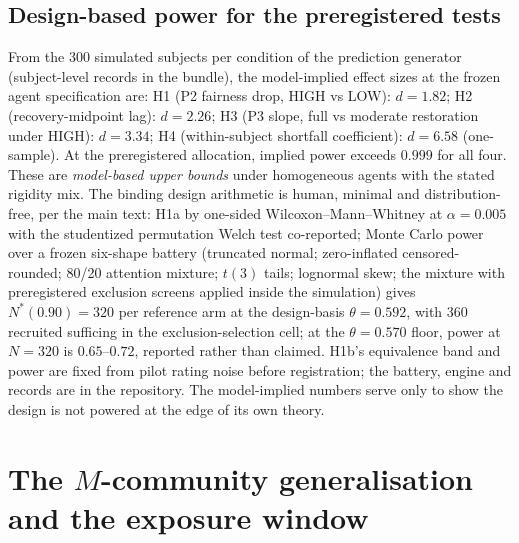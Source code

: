 \documentclass[11pt]{article}
\newcommand{\1}{\mathbf{1}}
\begin{document}
\subsection{Design-based power for the preregistered tests}
From the 300 simulated subjects per condition of the prediction generator
(subject-level records in the bundle), the model-implied effect sizes at the frozen agent
specification are: H1 (P2 fairness drop, HIGH vs LOW): $d=1.82$; H2 (recovery-midpoint
lag): $d=2.26$; H3 (P3 slope, full vs moderate restoration under HIGH): $d=3.34$; H4
(within-subject shortfall coefficient): $d=6.58$ (one-sample). At the preregistered
allocation, implied power exceeds $0.999$ for all four. These are \emph{model-based
upper bounds} under homogeneous agents with the stated rigidity mix. The binding design
arithmetic is human, minimal and distribution-free, per the main text: H1a by
one-sided Wilcoxon--Mann--Whitney at $\alpha=0.005$ with the studentized permutation
Welch test co-reported; Monte Carlo power over a frozen six-shape battery (truncated
normal; zero-inflated censored-rounded; 80/20 attention mixture; $t(3)$ tails;
lognormal skew; the mixture with preregistered exclusion screens applied inside the
simulation) gives $N^{*}(0.90)=320$ per reference arm at the design-basis
$\theta=0.592$, with $360$ recruited sufficing in the exclusion-selection cell; at
the $\theta=0.570$ floor, power at $N=320$ is $0.65$--$0.72$, reported rather than
claimed. H1b's equivalence band and power are fixed from pilot rating noise before
registration; the battery, engine and records are in the repository. The model-implied numbers serve only to show the design is
not powered at the edge of its own theory.

\section{The $M$-community generalisation and the exposure window}
\label{s:mnet}
\end{document}
